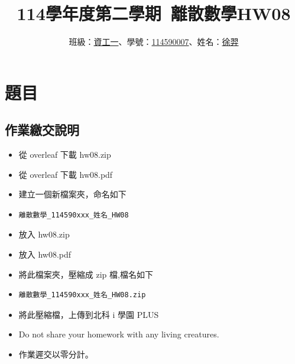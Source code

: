\documentclass[sigconf]{acmart}
\begin{document}
\title{114學年度第二學期~離散數學HW08}

\author{班級：\underline{資工一}、學號：\underline{114590007}、姓名：\underline{徐羿}}
\orcid{}
\affiliation{%
  \institution{}
  \city{}
  \country{}
}

\renewcommand\footnotetextcopyrightpermission[1]{} %
\pagestyle{plain} %

\maketitle


\section{題目}
\subsection{作業繳交說明}
\begin{shaded}
\begin{itemize}
    \item[-] 從 overleaf 下載 hw08.zip
    \item[-] 從 overleaf 下載 hw08.pdf
    \item[-] 建立一個新檔案夾，命名如下
    \item[-] \color{red}\begin{verbatim}離散數學_114590xxx_姓名_HW08\end{verbatim}
    \item[-] \color{black}放入 hw08.zip
    \item[-] 放入 hw08.pdf
    \item[-] 將此檔案夾，壓縮成 zip 檔,檔名如下
    \item[-] \color{red}\begin{verbatim}離散數學_114590xxx_姓名_HW08.zip\end{verbatim}
    \item[-] \color{black}將此壓縮檔，上傳到北科 i 學園 PLUS
    \item[-] Do not share your homework with any living creatures.
    \item[-] 作業遲交以零分計。
\end{itemize}
\end{shaded}
\end{document}
